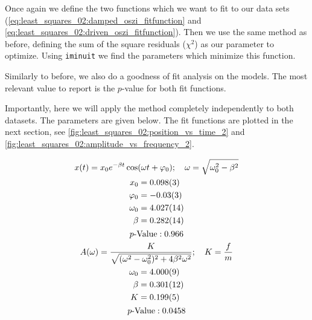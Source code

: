 Once again we define the two functions which we want to fit to our data sets (\autoref{eq:least_squares_02:damped_oszi_fitfunction} and \autoref{eq:least_squares_02:driven_oszi_fitfunction}). Then we use the same method as before, defining the sum of the square residuals ($\chi^2$) as our parameter to optimize. Using \verb|iminuit| we find the parameters which minimize this function.

Similarly to before, we also do a goodness of fit analysis on the models. The most relevant value to report is the \( p \)-value for both fit functions.

Importantly, here we will apply the method completely independently to both datasets. The parameters are given below. The fit functions are plotted in the next section, see \autoref{fig:least_squares_02:position_vs_time_2} and \autoref{fig:least_squares_02:amplitude_vs_frequency_2}.

\begin{gather}
    x(t) = x_0 e^{- \beta t} \cos(\omega t + \varphi_0); \quad \omega = \sqrt{\omega_0^2 - \beta^2}
    \label{eq:least_squares_02:damped_oszi_fitfunction} \\
    \begin{aligned}
        x_0 &= \num{0.098 \pm 0.003} \\
        \varphi_0 &= \num{-0.03 \pm 0.03} \\
        \omega_0 &= \num{4.027 \pm 0.014} \\
        \beta &= \num{0.282 \pm 0.014}
    \end{aligned} \\
    p \text{-Value}: \num{0.966} \\
    A(\omega) = \frac{K}{\sqrt{(\omega^2 - \omega_0^2)^2 + 4 \beta^2 \omega^2}}; \quad K = \frac{f}{m}
    \label{eq:least_squares_02:driven_oszi_fitfunction} \\
    \begin{aligned}
        \omega_0 &= \num{4.000 \pm 0.009} \\
        \beta &= \num{0.301 \pm 0.012} \\
        K &= \num{0.199 \pm 0.005}
    \end{aligned} \\
    p \text{-Value}: \num{0.0458} \\
\end{gather}


